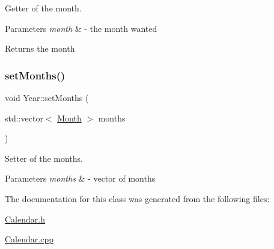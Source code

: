 Getter of the month. 


\begin{DoxyParams}{Parameters}
{\em month} & -\/ the month wanted \\
\hline
\end{DoxyParams}
\begin{DoxyReturn}{Returns}
the month 
\end{DoxyReturn}
\mbox{\label{class_year_a1478407d9100f722e54daaf1ce2a413c}} 
\subsubsection{\texorpdfstring{set\+Months()}{setMonths()}}
{\footnotesize\ttfamily void Year\+::set\+Months (\begin{DoxyParamCaption}\item[{std\+::vector$<$ \mbox{\hyperlink{class_month}{Month}} $>$}]{months }\end{DoxyParamCaption})}



Setter of the months. 


\begin{DoxyParams}{Parameters}
{\em months} & -\/ vector of months \\
\hline
\end{DoxyParams}


The documentation for this class was generated from the following files\+:\begin{DoxyCompactItemize}
\item 
\mbox{\hyperlink{_calendar_8h}{Calendar.\+h}}\item 
\mbox{\hyperlink{_calendar_8cpp}{Calendar.\+cpp}}\end{DoxyCompactItemize}
